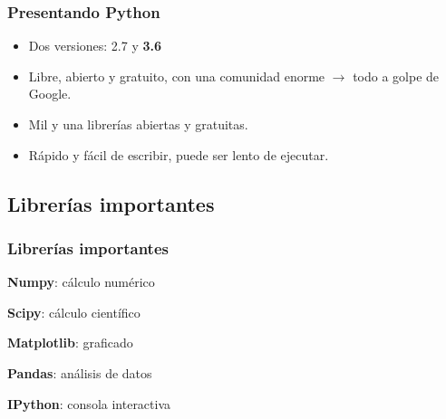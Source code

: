 \documentclass{beamer}
\begin{document}
\begin{frame}\frametitle{Presentando Python}
	\begin{itemize}
		\item Dos versiones: 2.7 y \textbf{3.6}
		\item Libre, abierto y gratuito, con una comunidad enorme $\rightarrow$ todo a golpe de Google.
		\item Mil y una librerías abiertas y gratuitas.
		\item Rápido y fácil de escribir, puede ser lento de ejecutar.
	\end{itemize}
\end{frame}

\subsection{Librerías importantes}

\begin{frame}\frametitle{Librerías importantes}
	\begin{figure}
	\end{figure}

	\centering
	\textbf{Numpy}: cálculo numérico

	\textbf{Scipy}: cálculo científico

	\textbf{Matplotlib}: graficado
	
	\textbf{Pandas}: análisis de datos
	
	\textbf{IPython}: consola interactiva
\end{frame}
\end{document}
